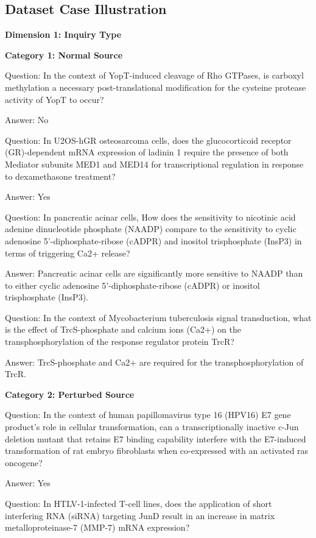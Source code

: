 
\subsection{Dataset Case Illustration} \label{appendix data cases}



\textbf{Dimension 1: Inquiry Type}

\textbf{Category 1: Normal Source} 

Question: In the context of YopT-induced cleavage of Rho GTPases, is carboxyl methylation a necessary post-translational modification for the cysteine protease activity of YopT to occur?


Answer: No

Question: In U2OS-hGR osteosarcoma cells, does the glucocorticoid receptor (GR)-dependent mRNA expression of ladinin 1 require the presence of both Mediator subunits MED1 and MED14 for transcriptional regulation in response to dexamethasone treatment?

Answer: Yes

Question: In pancreatic acinar cells, How does the sensitivity to nicotinic acid adenine dinucleotide phosphate (NAADP) compare to the sensitivity to cyclic adenosine 5'-diphosphate-ribose (cADPR) and inositol trisphosphate (InsP3) in terms of triggering Ca2+ release?

Answer: Pancreatic acinar cells are significantly more sensitive to NAADP than to either cyclic adenosine 5'-diphosphate-ribose (cADPR) or inositol trisphosphate (InsP3).

Question: In the context of Mycobacterium tuberculosis signal transduction, what is the effect of TrcS-phosphate and calcium ions (Ca2+) on the transphosphorylation of the response regulator protein TrcR?

Answer: TrcS-phosphate and Ca2+ are required for the transphosphorylation of TrcR.

\textbf{Category 2: Perturbed Source} 

Question: In the context of human papillomavirus type 16 (HPV16) E7 gene product's role in cellular transformation, can a transcriptionally inactive c-Jun deletion mutant that retains E7 binding capability interfere with the E7-induced transformation of rat embryo fibroblasts when co-expressed with an activated ras oncogene?

Answer: Yes

Question: In HTLV-1-infected T-cell lines, does the application of short interfering RNA (siRNA) targeting JunD result in an increase in matrix metalloproteinase-7 (MMP-7) mRNA expression?

